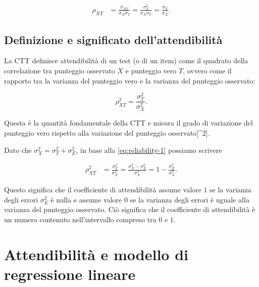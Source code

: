 \documentclass[
  11pt,
]{krantz}
\theoremstyle{definition}
\theoremstyle{definition}
\theoremstyle{definition}
\theoremstyle{definition}
\theoremstyle{remark}
\begin{document}
\begin{equation}
\begin{aligned}
\rho_{XT} &= \frac{\sigma_{XT}}{\sigma_X \sigma_T} = \frac{\sigma^2_{T}}{\sigma_X \sigma_T} = \frac{\sigma_{T}}{\sigma_X}.
\label{eq:sd-ratio}
\end{aligned}
\end{equation}

\hypertarget{definizione-e-significato-dellattendibilituxe0}{%
\subsection{Definizione e significato dell'attendibilità}\label{definizione-e-significato-dellattendibilituxe0}}

La CTT definisce attendibilità di un test (o di un item) come il quadrato della correlazione tra punteggio osservato \(X\) e punteggio vero \(T\), ovvero come il rapporto tra la varianza del punteggio vero e la varianza del punteggio osservato:

\[
\rho_{XT}^2 = \frac{\sigma_{T}^2}{\sigma_X^2}.
\label{eq:reliability-1}
\]

Questa è la quantità fondamentale della CTT e misura il grado di variazione del punteggio vero rispetto alla variazione del punteggio osservato{[}\^{}2{]}.

Dato che \(\sigma^2_X = \sigma_T^2 + \sigma_E^2\), in base alla \eqref{eq:reliability-1} possiamo scrivere

\begin{equation}
\begin{aligned}
\rho_{XT}^2 &= \frac{\sigma_{T}^2}{\sigma_X^2} =\frac{\sigma_{X}^2 - \sigma^2_E}{\sigma_X^2}
 = 1-\frac{\sigma_{E}^2}{\sigma_X^2}.
 \label{eq:3-2-6}
\end{aligned}
\end{equation}

Questo significa che il coefficiente di attendibilità assume valore \(1\) se la varianza degli errori \(\sigma_{E}^2\) è nulla e assume valore \(0\) se la varianza degli errori è uguale alla varianza del punteggio osservato. Ciò significa che il coefficiente di attendibilità è un numero contenuto nell'intervallo compreso tra \(0\) e \(1\).

\hypertarget{attendibilituxe0-e-modello-di-regressione-lineare}{%
\section{Attendibilità e modello di regressione lineare}\label{attendibilituxe0-e-modello-di-regressione-lineare}}
\end{document}
